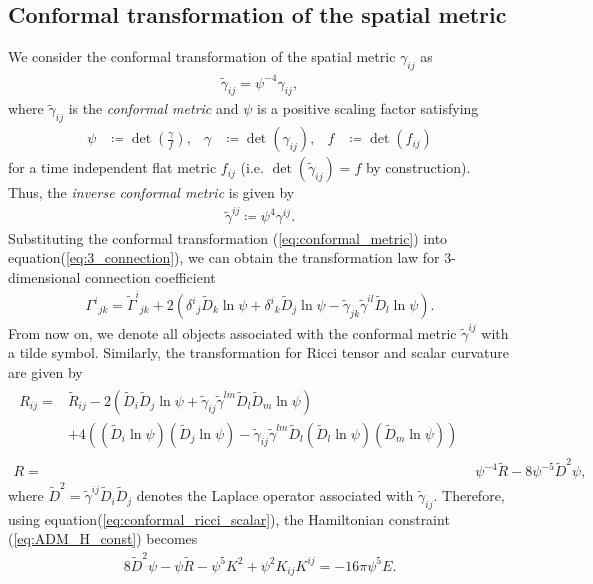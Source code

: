 \subsection{Conformal transformation of the spatial metric}
\label{section2.3.1}
We consider the conformal transformation of the spatial metric $\gamma_{ij}$ as
\begin{align}\label{eq:conformal_metric}
    \tilde{\gamma}_{ij} = \psi^{-4} \gamma_{ij},
\end{align}
where $\tilde{\gamma}_{ij}$ is the \textit{conformal metric} and $\psi$ is a positive scaling factor satisfying
\begin{align}
    \psi &\coloneqq \det{\left( \frac{\gamma}{f} \right)}, & \gamma &\coloneqq \det{\left( \gamma_{ij} \right)}, & f &\coloneqq \det{\left( f_{ij} \right)}
\end{align}
for a time independent flat metric $f_{ij}$ (i.e. $\det{\left( \tilde{\gamma}_{ij} \right)} = f$ by construction).\\
Thus, the \textit{inverse conformal metric} is given by
\begin{align}\label{eq:conformal_metric_inv}
    \tilde{\gamma}^{ij} \coloneqq \psi^4 \gamma^{ij}.
\end{align}
Substituting the conformal transformation (\ref{eq:conformal_metric}) into equation(\ref{eq:3_connection}),
we can obtain the transformation law for 3-dimensional connection coefficient
\begin{align}
    \Gamma^{i}{}_{jk} = \tilde{\Gamma}^{i}{}_{jk} + 2 \left( \delta^i{}_j \tilde{D}_k \ln \psi + \delta^i{}_k \tilde{D}_j \ln \psi
    - \tilde{\gamma}_{jk} \tilde{\gamma}^{il} \tilde{D}_l \ln \psi \right).
\end{align}
From now on, we denote all objects associated with the conformal metric $\tilde{\gamma}^{ij}$ with a tilde symbol.
Similarly, the transformation for Ricci tensor and scalar curvature are given by
\begin{align}
\begin{split}
    R_{ij} =& \tilde{R}_{ij} - 2 \left( \tilde{D}_i \tilde{D}_j \ln \psi + \tilde{\gamma}_{ij} \tilde{\gamma}^{lm} \tilde{D}_l \tilde{D}_m \ln \psi \right)\\
    &+ 4 \left( \left(\tilde{D}_i \ln \psi \right) \left( \tilde{D}_j \ln \psi \right) - \tilde{\gamma}_{ij} \tilde{\gamma}^{lm} \tilde{D}_l \left(\tilde{D}_l \ln \psi \right) \left( \tilde{D}_m \ln \psi \right) \right)
\end{split} \label{eq:conformal_ricci_tensor}\\
    R =& \psi^{-4} \tilde{R} - 8 \psi^{-5} \tilde{D}^2 \psi, \label{eq:conformal_ricci_scalar}
\end{align}
where $\tilde{D}^2 = \tilde{\gamma}^{ij} \tilde{D}_i \tilde{D}_j$ denotes the Laplace operator associated with $\tilde{\gamma}_{ij}$.
Therefore, using equation(\ref{eq:conformal_ricci_scalar}), the Hamiltonian constraint (\ref{eq:ADM_H_const}) becomes
\begin{align}
    8 \tilde{D}^2 \psi - \psi \tilde{R} - \psi^5 K^2 + \psi^2 K_{ij} K^{ij} = - 16 \pi \psi^5 E.
\end{align}

